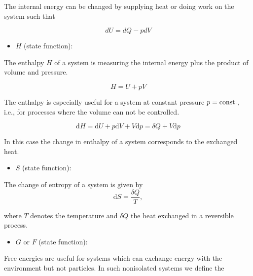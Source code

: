 \documentclass[letterpaper,10pt,english]{sphinxmanual}
\begin{document}
\sphinxAtStartPar
The internal energy can be changed by supplying heat or doing work on the system such that

\sphinxAtStartPar
\begin{equation}
dU=dQ-pdV
\end{equation}
\begin{itemize}
\item {} 
\sphinxAtStartPar
{} \(H\) (state function):

\end{itemize}

\sphinxAtStartPar
The enthalpy \(H\) of a system is measuring the internal energy plus the product of volume and pressure.

\sphinxAtStartPar
\begin{equation}
H=U+pV
\end{equation}

\sphinxAtStartPar
The enthalpy is especially useful for a system at constant pressure \(p={\rm const.}\), i.e., for processes where the volume can not be controlled.

\sphinxAtStartPar
\begin{equation}
\mathrm{d}H=\mathrm{d}U+p\mathrm{d}V+V\mathrm{d}p=\delta Q + V\mathrm{d}p
\end{equation}

\sphinxAtStartPar
In this case the change in enthalpy of a system corresponds to the exchanged heat.
\begin{itemize}
\item {} 
\sphinxAtStartPar
{} \(S\) (state function):

\end{itemize}

\sphinxAtStartPar
The change of entropy of a system is given by \begin{equation}
\mathrm{d}S=\frac{\delta Q}{T},
\end{equation}

\sphinxAtStartPar
where \(T\) denotes the temperature and \(\delta Q\) the heat exchanged in a reversible process.
\begin{itemize}
\item {} 
\sphinxAtStartPar
{} \(G\) or \(F\) (state function):

\end{itemize}

\sphinxAtStartPar
Free energies are useful for systems which can exchange energy with the environment but not particles. In such non\sphinxhyphen{}isolated systems we define the
\end{document}
